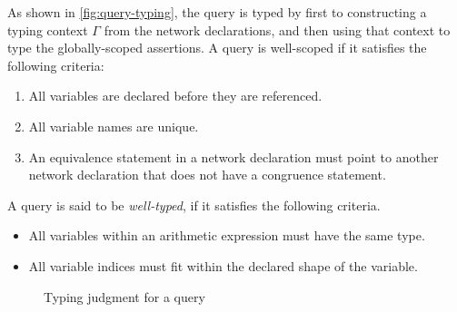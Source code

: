 As shown in \autoref{fig:query-typing}, the query is typed by first to constructing a typing context $\Gamma$ from the network declarations, and then using that context to type the globally-scoped assertions.
A \vnnlib{} query is well-scoped if it satisfies the following criteria:
\begin{enumerate}
    \item All variables are declared before they are referenced.
    \item All variable names are unique.
    \item An equivalence statement in a network declaration must point to another network declaration that does not have a congruence statement.
\end{enumerate}
A \vnnlib{} query is said to be \textit{well-typed}, if it satisfies the following criteria.
\begin{itemize}
    \item All variables within an arithmetic expression must have the same type.
    \item All variable indices must fit within the declared shape of the variable.
\end{itemize}

\begin{figure}
    \begin{minipage}[t]{1\textwidth}
    \caption{Typing judgment for a \vnnlib{} query}
    \label{fig:query-typing}
    \end{minipage}
\end{figure}

